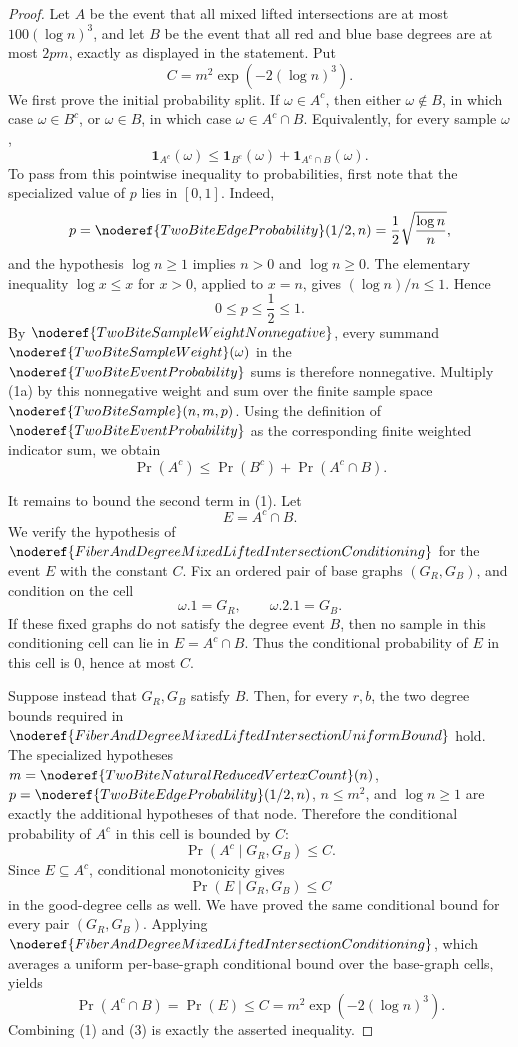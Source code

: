 \begin{proof}
Let \(A\) be the event that all mixed lifted intersections are at most
\(100(\log n)^3\), and let \(B\) be the event that all red and blue base
degrees are at most \(2pm\), exactly as displayed in the statement.  Put
\[
C=m^2\exp(-2(\log n)^3).
\]
We first prove the initial probability split.  If \(\omega\in A^c\), then
either \(\omega\notin B\), in which case \(\omega\in B^c\), or
\(\omega\in B\), in which case \(\omega\in A^c\cap B\).  Equivalently, for
every sample \(\omega\),
\[
\mathbf 1_{A^c}(\omega)
\le
\mathbf 1_{B^c}(\omega)+\mathbf 1_{A^c\cap B}(\omega).
\tag{1a}
\]
To pass from this pointwise inequality to probabilities, first note that the
specialized value of \(p\) lies in \([0,1]\).  Indeed,
\[
p=\noderef{TwoBiteEdgeProbability}(1/2,n)
=\frac12\sqrt{\frac{\log n}{n}},
\]
and the hypothesis \(\log n\ge1\) implies \(n>0\) and
\(\log n\ge0\).  The elementary inequality \(\log x\le x\) for
\(x>0\), applied to \(x=n\), gives \((\log n)/n\le1\).  Hence
\[
0\le p\le \frac12\le1.
\tag{1b}
\]
By \(\noderef{TwoBiteSampleWeightNonnegative}\), every summand
\(\noderef{TwoBiteSampleWeight}(\omega)\) in the
\(\noderef{TwoBiteEventProbability}\) sums is therefore nonnegative.  Multiply
(1a) by this nonnegative weight and sum over the finite sample space
\(\noderef{TwoBiteSample}(n,m,p)\).  Using the definition of
\(\noderef{TwoBiteEventProbability}\) as the corresponding finite weighted
indicator sum, we obtain
\[
\Pr(A^c)\le \Pr(B^c)+\Pr(A^c\cap B).
\tag{1}
\]

It remains to bound the second term in (1).  Let
\[
E=A^c\cap B.
\]
We verify the hypothesis of
\(\noderef{FiberAndDegreeMixedLiftedIntersectionConditioning}\) for the event
\(E\) with the constant \(C\).  Fix an ordered pair of base graphs
\((G_R,G_B)\), and condition on the cell
\[
\omega.1=G_R,\qquad \omega.2.1=G_B.
\]
If these fixed graphs do not satisfy the degree event \(B\), then no sample
in this conditioning cell can lie in \(E=A^c\cap B\).  Thus the conditional
probability of \(E\) in this cell is \(0\), hence at most \(C\).

Suppose instead that \(G_R,G_B\) satisfy \(B\).  Then, for every \(r,b\), the
two degree bounds required in
\(\noderef{FiberAndDegreeMixedLiftedIntersectionUniformBound}\) hold.  The
specialized hypotheses \(m=\noderef{TwoBiteNaturalReducedVertexCount}(n)\),
\(p=\noderef{TwoBiteEdgeProbability}(1/2,n)\), \(n\le m^2\), and
\(\log n\ge1\) are exactly the additional hypotheses of that node.  Therefore
the conditional probability of \(A^c\) in this cell is bounded by \(C\):
\[
\Pr(A^c\mid G_R,G_B)\le C.
\tag{2}
\]
Since \(E\subseteq A^c\), conditional monotonicity gives
\[
\Pr(E\mid G_R,G_B)\le C
\]
in the good-degree cells as well.  We have proved the same conditional bound
for every pair \((G_R,G_B)\).  Applying
\(\noderef{FiberAndDegreeMixedLiftedIntersectionConditioning}\), which
averages a uniform per-base-graph conditional bound over the base-graph
cells, yields
\[
\Pr(A^c\cap B)=\Pr(E)\le C=m^2\exp(-2(\log n)^3).
\tag{3}
\]
Combining (1) and (3) is exactly the asserted inequality.
\end{proof}
